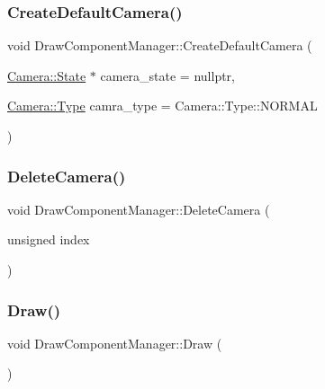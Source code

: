\subsubsection{\texorpdfstring{Create\+Default\+Camera()}{CreateDefaultCamera()}}
{\footnotesize\ttfamily void Draw\+Component\+Manager\+::\+Create\+Default\+Camera (\begin{DoxyParamCaption}\item[{\mbox{\hyperlink{class_camera_1_1_state}{Camera\+::\+State}} $\ast$}]{camera\+\_\+state = {\ttfamily nullptr},  }\item[{\mbox{\hyperlink{class_camera_a3b0a1f58deca679ac665f61c480d1dcb}{Camera\+::\+Type}}}]{camra\+\_\+type = {\ttfamily Camera\+:\+:Type\+:\+:NORMAL} }\end{DoxyParamCaption})\hspace{0.3cm}{\ttfamily [static]}}

\mbox{\label{class_draw_component_manager_a577fc268235808a70610c9f2a9781c9d}} 
\subsubsection{\texorpdfstring{Delete\+Camera()}{DeleteCamera()}}
{\footnotesize\ttfamily void Draw\+Component\+Manager\+::\+Delete\+Camera (\begin{DoxyParamCaption}\item[{unsigned}]{index }\end{DoxyParamCaption})\hspace{0.3cm}{\ttfamily [static]}}

\mbox{\label{class_draw_component_manager_af851685a13701b040398eb42b2f97c32}} 
\subsubsection{\texorpdfstring{Draw()}{Draw()}}
{\footnotesize\ttfamily void Draw\+Component\+Manager\+::\+Draw (\begin{DoxyParamCaption}{ }\end{DoxyParamCaption})\hspace{0.3cm}{\ttfamily [static]}}

